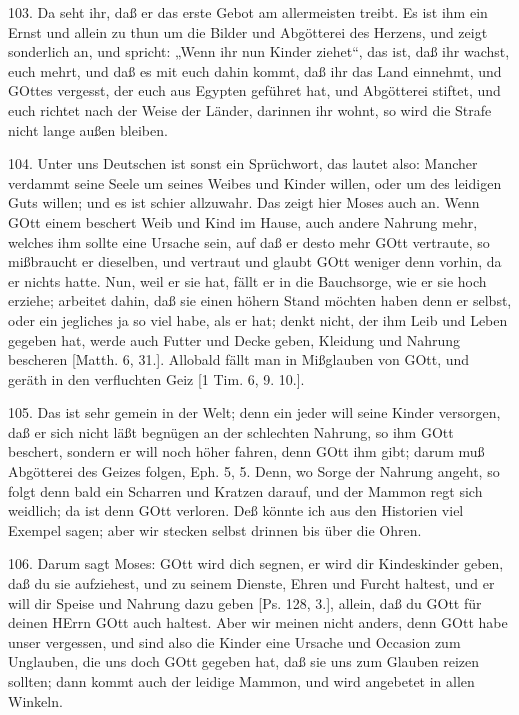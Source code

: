 103. Da seht ihr, daß er das erste Gebot am allermeisten treibt. Es ist ihm ein Ernst und allein zu thun um die Bilder und Abgötterei des Herzens, und zeigt sonderlich an, und spricht: „Wenn ihr nun Kinder ziehet“, das ist, daß ihr wachst, euch mehrt, und daß es mit euch dahin kommt, daß ihr das Land einnehmt, und GOttes vergesst, der euch aus Egypten geführet hat, und Abgötterei stiftet, und euch richtet nach der Weise der Länder, darinnen ihr wohnt, so wird die Strafe nicht lange außen bleiben.

104. Unter uns Deutschen ist sonst ein Sprüchwort, das lautet also: Mancher verdammt seine Seele um seines Weibes und Kinder willen, oder um des leidigen Guts willen; und es ist schier allzuwahr. Das zeigt hier Moses auch an. Wenn GOtt einem beschert Weib und Kind im Hause, auch andere Nahrung mehr, welches ihm sollte eine Ursache sein, auf daß er desto mehr GOtt vertraute, so mißbraucht er dieselben, und vertraut und glaubt GOtt weniger denn vorhin, da er nichts hatte. Nun, weil er sie hat, fällt er in die Bauchsorge, wie er sie hoch erziehe; arbeitet dahin, daß sie einen höhern Stand möchten haben denn er selbst, oder ein jegliches ja so viel habe, als er hat; denkt nicht, der ihm Leib und Leben gegeben hat, werde auch Futter und Decke geben, Kleidung und Nahrung bescheren [Matth. 6, 31.]. Allobald fällt man in Mißglauben von GOtt, und geräth in den verfluchten Geiz [1 Tim. 6, 9. 10.].

105. Das ist sehr gemein in der Welt; denn ein jeder will seine Kinder versorgen, daß er sich nicht läßt begnügen an der schlechten Nahrung, so ihm GOtt beschert, sondern er will noch höher fahren, denn GOtt ihm gibt; darum muß Abgötterei des Geizes folgen, Eph. 5, 5. Denn, wo Sorge der Nahrung angeht, so folgt denn bald ein Scharren und Kratzen darauf, und der Mammon regt sich weidlich; da ist denn GOtt verloren. Deß könnte ich aus den Historien viel Exempel sagen; aber wir stecken selbst drinnen bis über die Ohren.

106. Darum sagt Moses: GOtt wird dich segnen, er wird dir Kindeskinder geben, daß du sie aufziehest, und zu seinem Dienste, Ehren und Furcht haltest, und er will dir Speise und Nahrung dazu geben [Ps. 128, 3.], allein, daß du GOtt für deinen HErrn GOtt auch haltest. Aber wir meinen nicht anders, denn GOtt habe unser vergessen, und sind also die Kinder eine Ursache und Occasion zum Unglauben, die uns doch GOtt gegeben hat, daß sie uns zum Glauben reizen sollten; dann kommt auch der leidige Mammon, und wird angebetet in allen Winkeln.

